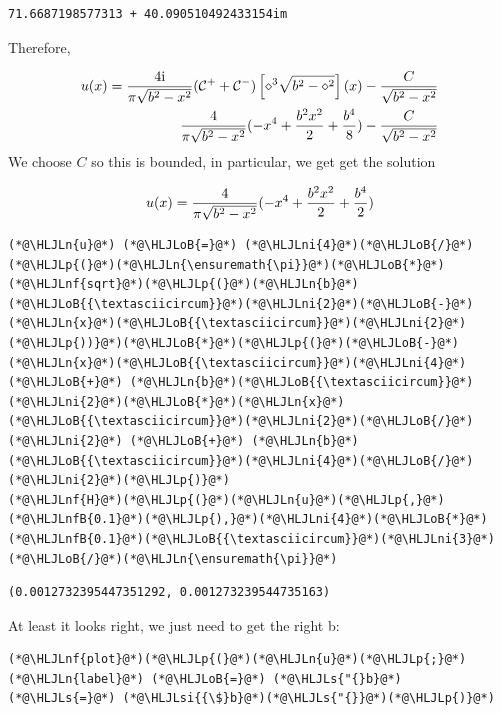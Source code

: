 \documentclass[12pt,a4paper]{article}
\newcommand{\HLJLn}[1]{#1}
\newcommand{\HLJLnf}[1]{\textcolor[RGB]{66,102,213}{#1}}
\newcommand{\HLJLs}[1]{\textcolor[RGB]{201,61,57}{#1}}
\newcommand{\HLJLsi}[1]{#1}
\newcommand{\HLJLnfB}[1]{\textcolor[RGB]{59,151,46}{#1}}
\newcommand{\HLJLni}[1]{\textcolor[RGB]{59,151,46}{#1}}
\newcommand{\HLJLoB}[1]{\textcolor[RGB]{102,102,102}{\textbf{#1}}}
\newcommand{\HLJLp}[1]{#1}
\def\I{ {\rm i} }
\def\CC{ {\cal C} }
\begin{document}
\begin{lstlisting}
71.6687198577313 + 40.090510492433154im
\end{lstlisting}


Therefore,


\begin{align*}
u(x) = {4\I \over \pi \sqrt{b^2 - x^2}}(\CC^+ + \CC^-) \left[{ \diamond^3  \sqrt{b^2-\diamond^2} }\right](x)  - {C \over \sqrt{b^2-x^2}} \\
{4 \over \pi \sqrt{b^2 - x^2}}(-x^4+{b^2 x^2 \over 2} + {b^4 \over 8})- {C \over \sqrt{b^2-x^2}} 
\end{align*}
We choose $C$ so this is bounded, in particular, we get get the solution

\[
u(x) = {4 \over \pi \sqrt{b^2 - x^2}}(-x^4+{b^2 x^2 \over 2} + {b^4 \over 2})
\]

\begin{lstlisting}
(*@\HLJLn{u}@*) (*@\HLJLoB{=}@*) (*@\HLJLni{4}@*)(*@\HLJLoB{/}@*)(*@\HLJLp{(}@*)(*@\HLJLn{\ensuremath{\pi}}@*)(*@\HLJLoB{*}@*)(*@\HLJLnf{sqrt}@*)(*@\HLJLp{(}@*)(*@\HLJLn{b}@*)(*@\HLJLoB{{\textasciicircum}}@*)(*@\HLJLni{2}@*)(*@\HLJLoB{-}@*)(*@\HLJLn{x}@*)(*@\HLJLoB{{\textasciicircum}}@*)(*@\HLJLni{2}@*)(*@\HLJLp{))}@*)(*@\HLJLoB{*}@*)(*@\HLJLp{(}@*)(*@\HLJLoB{-}@*)(*@\HLJLn{x}@*)(*@\HLJLoB{{\textasciicircum}}@*)(*@\HLJLni{4}@*) (*@\HLJLoB{+}@*) (*@\HLJLn{b}@*)(*@\HLJLoB{{\textasciicircum}}@*)(*@\HLJLni{2}@*)(*@\HLJLoB{*}@*)(*@\HLJLn{x}@*)(*@\HLJLoB{{\textasciicircum}}@*)(*@\HLJLni{2}@*)(*@\HLJLoB{/}@*)(*@\HLJLni{2}@*) (*@\HLJLoB{+}@*) (*@\HLJLn{b}@*)(*@\HLJLoB{{\textasciicircum}}@*)(*@\HLJLni{4}@*)(*@\HLJLoB{/}@*)(*@\HLJLni{2}@*)(*@\HLJLp{)}@*)
(*@\HLJLnf{H}@*)(*@\HLJLp{(}@*)(*@\HLJLn{u}@*)(*@\HLJLp{,}@*) (*@\HLJLnfB{0.1}@*)(*@\HLJLp{),}@*)(*@\HLJLni{4}@*)(*@\HLJLoB{*}@*)(*@\HLJLnfB{0.1}@*)(*@\HLJLoB{{\textasciicircum}}@*)(*@\HLJLni{3}@*)(*@\HLJLoB{/}@*)(*@\HLJLn{\ensuremath{\pi}}@*)
\end{lstlisting}

\begin{lstlisting}
(0.0012732395447351292, 0.001273239544735163)
\end{lstlisting}


At least it looks right, we just need to get the right b:


\begin{lstlisting}
(*@\HLJLnf{plot}@*)(*@\HLJLp{(}@*)(*@\HLJLn{u}@*)(*@\HLJLp{;}@*) (*@\HLJLn{label}@*) (*@\HLJLoB{=}@*) (*@\HLJLs{"{}b}@*) (*@\HLJLs{=}@*) (*@\HLJLsi{{\$}b}@*)(*@\HLJLs{"{}}@*)(*@\HLJLp{)}@*)
\end{lstlisting}
\end{document}
